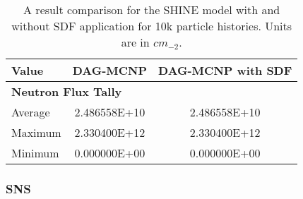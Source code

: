 \begin{table}
  \small
  \begin{center}
    \begin{tabular}{lcc}
          \toprule
          Value   & DAG-MCNP     & DAG-MCNP with SDF      \\
          \toprule
          \multicolumn{3}{l}{\textbf{Neutron Flux Tally}} \\
          Average & 2.486558E+10 & 2.486558E+10           \\
          Maximum & 2.330400E+12 & 2.330400E+12           \\
          Minimum & 0.000000E+00 & 0.000000E+00           \\
          \bottomrule
    \end{tabular}
  \end{center}
  \caption[Flux tally results in the SHINE model for various DAG-MCNP
    implementations.]{A result comparison for the SHINE model with and without
    SDF application for 10k particle histories. Units are in $cm_{-2}$.}
\end{table}

\subsubsection{SNS}

